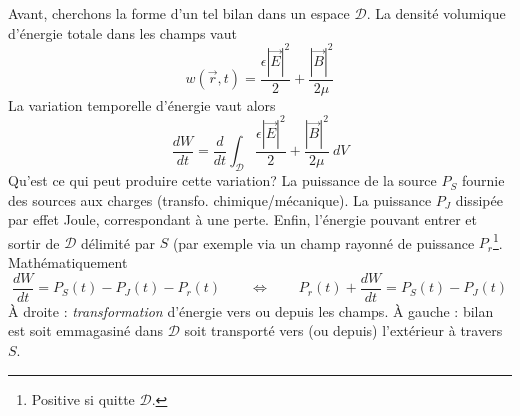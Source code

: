 Avant, cherchons la forme d'un tel bilan dans un espace $\mathcal{D}$. La densité volumique 
d'énergie totale dans les champs vaut
\begin{equation}
w(\vec{r},t) = \dfrac{\epsilon|\vec{E}|^2}{2}+\dfrac{|\vec{B}|^2}{2\mu}
\end{equation}
La variation temporelle d'énergie vaut alors
\begin{equation}
\dfrac{dW}{dt} = \dfrac{d}{dt}\int_\mathcal{D}\dfrac{\epsilon|\vec{E}|^2}{2}+\dfrac{|\vec{B}|^2}{2\mu}
\ dV
\end{equation} 
Qu'est ce qui peut produire cette variation? La puissance de la source $P_S$ fournie des sources 
aux charges (transfo. chimique/mécanique). La puissance $P_J$ dissipée par effet Joule, correspondant 
à une perte. Enfin, l'énergie pouvant entrer et sortir de $\mathcal{D}$ délimité par $S$ (par exemple 
via un champ rayonné de puissance $P_r$\footnote{Positive si quitte $\mathcal{D}$.}. Mathématiquement
\begin{equation}
\dfrac{dW}{dt} = P_S(t)-P_J(t)-P_r(t)\qquad\Leftrightarrow\qquad P_r(t)+\dfrac{dW}{dt} = P_S(t)-P_J(t)
\end{equation}
À droite : \textit{transformation}	d'énergie vers ou depuis les champs. À gauche : bilan est soit 
emmagasiné dans $\mathcal{D}$ soit transporté vers (ou depuis) l'extérieur à travers $S$.
	

